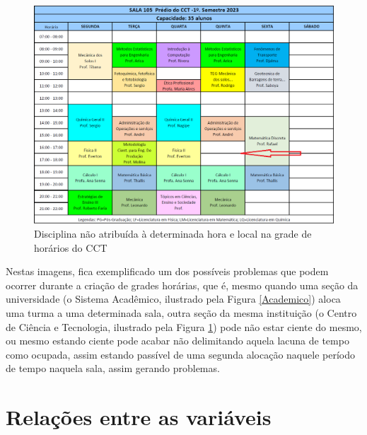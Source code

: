 \begin{figure}[htbp]\centering
  \caption{\label{CCT}Disciplina não atribuída à determinada hora e local na grade de horários do CCT}
  \includegraphics[angle=0,scale=0.5]{files/img/FalhaDeAlocacao/Aulas-CCT-105-2023_1.png}
\end{figure}    %

Nestas imagens, fica exemplificado um dos possíveis problemas que podem ocorrer durante a criação de grades horárias, que é, mesmo quando uma seção da universidade (o Sistema Acadêmico, ilustrado pela Figura \ref{Academico}) aloca uma turma a uma determinada sala, outra seção da mesma instituição (o Centro de Ciência e Tecnologia, ilustrado pela Figura \ref{CCT}) pode não estar ciente do mesmo, ou mesmo estando ciente pode acabar não delimitando aquela lacuna de tempo como ocupada, assim estando passível de uma segunda alocação naquele período de tempo naquela sala, assim gerando problemas.

\section{Relações entre as variáveis} %

